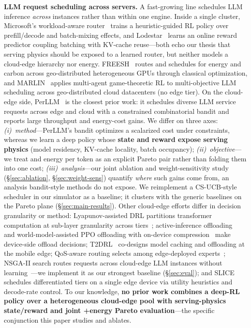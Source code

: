 \textbf{LLM request scheduling across servers.} A fast-growing
line schedules LLM inference \emph{across} instances rather
than within one engine. Inside a single cluster, Microsoft's
workload-aware router~\cite{jain2024router} trains a
heuristic-guided RL policy over prefill/decode and batch-mixing
effects, and Lodestar~\cite{lim2026lodestar} learns an online
reward predictor coupling batching with KV-cache reuse---both
echo our thesis that serving physics should be exposed to a
learned router, but neither models a cloud-edge hierarchy nor
energy. FREESH~\cite{he2025freesh} routes and schedules for
energy and carbon across geo-distributed heterogeneous GPUs
through classical optimization, and
MARLIN~\cite{moore2026marlin} applies multi-agent
game-theoretic RL to multi-objective LLM scheduling across
geo-distributed cloud datacenters (no edge tier). On the cloud-edge side,
PerLLM~\cite{yang2024perllm} is the closest prior work: it
schedules diverse LLM service requests across edge and cloud
with a constrained combinatorial bandit and reports large
throughput and energy-cost gains. We differ on three axes:
\emph{(i)~method}---PerLLM's bandit optimizes a scalarized
cost under constraints, whereas we learn a deep policy whose
\textbf{state and reward expose serving physics} (model
residency, KV-cache locality, batch occupancy);
\emph{(ii)~objective}---we treat \slo{} and energy per token
as an explicit Pareto pair rather than folding them into one
cost; \emph{(iii)~analysis}---our joint ablation and
weight-sensitivity study (\S\ref{sec:ablation},
\S\ref{sec:weight-sens}) quantify \emph{where} such gains come
from, an analysis bandit-style methods do not expose. We
reimplement a CS-UCB-style scheduler in our simulator as a
baseline; it clusters with the generic baselines on the
Pareto plane (\S\ref{sec:main-results}). Other
cloud-edge efforts differ in decision granularity or method:
Lyapunov-assisted DRL partitions transformer computation at
sub-layer granularity across
tiers~\cite{younesi2025lyapunov}; active-inference
offloading~\cite{he2024activeinference} and
world-model-assisted PPO offloading with on-device
compression~\cite{zhang2026worldmodel} make device-side
offload decisions; T2DRL~\cite{xu2025t2drl} co-designs model
caching and offloading at the mobile edge; QoS-aware routing
selects among edge-deployed experts~\cite{yang2025qosrouting};
NSGA-II search routes requests across cloud-edge LLM instances
without learning~\cite{yu2025llmrouting}---we implement it as
our strongest baseline (\S\ref{sec:eval}); and
SLICE~\cite{chow2025slice} schedules differentiated \slo{}
tiers on a single edge device via utility heuristics and
decode-rate control. To our knowledge, \textbf{no prior work
combines a deep-RL policy over a heterogeneous cloud-edge
pool with serving-physics state/reward and joint
\slo{}+energy Pareto evaluation}---the specific conjunction
this paper studies and ablates.

